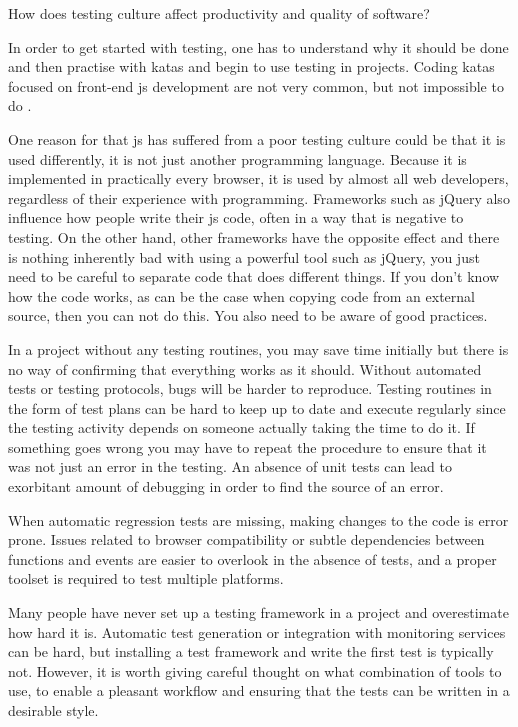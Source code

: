 \documentclass[11pt]{article}
\begin{document}
How does testing culture affect productivity and quality of software?

In order to get started with testing, one has to understand why it should be done \cite[question~38]{Edelstam} and then practise with katas and begin to use testing in projects. Coding katas focused on front-end \gls{js} development are not very common, but not impossible to do \cite[question~47]{Ahnve}.

One reason for that \gls{js} has suffered from a poor testing culture could be that it is used differently, it is not just another programming language. Because it is implemented in practically every browser, it is used by almost all web developers, regardless of their experience with programming. Frameworks such as jQuery also influence how people write their \gls{js} code, often in a way that is negative to testing. On the other hand, other frameworks have the opposite effect and there is nothing inherently bad with using a powerful tool such as jQuery, you just need to be careful to separate code that does different things. If you don't know how the code works, as can be the case when copying code from an external source, then you can not do this. You also need to be aware of good practices.

In a project without any testing routines, you may save time initially but there is no way of confirming that everything works as it should. Without automated tests or testing protocols, bugs will be harder to reproduce. Testing routines in the form of test plans can be hard to keep up to date and execute regularly since the testing activity depends on someone actually taking the time to do it. If something goes wrong you may have to repeat the procedure to ensure that it was not just an error in the testing. An absence of unit tests can lead to exorbitant amount of debugging in order to find the source of an error.

When automatic regression tests are missing, making changes to the code is error prone. Issues related to browser compatibility or subtle dependencies between functions and events are easier to overlook in the absence of tests, and a proper toolset is required to test multiple platforms.

Many people have never set up a testing framework in a project and overestimate how hard it is. Automatic test generation or integration with monitoring services can be hard, but installing a test framework and write the first test is typically not. However, it is worth giving careful thought on what combination of tools to use, to enable a pleasant workflow and ensuring that the tests can be written in a desirable style.
\end{document}
